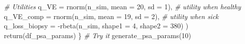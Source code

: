 \documentclass[
]{article}
\newenvironment{Shaded}{\begin{snugshade}}{\end{snugshade}}
\newcommand{\AttributeTok}[1]{\textcolor[rgb]{0.77,0.63,0.00}{#1}}
\newcommand{\CommentTok}[1]{\textcolor[rgb]{0.56,0.35,0.01}{\textit{#1}}}
\newcommand{\DecValTok}[1]{\textcolor[rgb]{0.00,0.00,0.81}{#1}}
\newcommand{\FunctionTok}[1]{\textcolor[rgb]{0.00,0.00,0.00}{#1}}
\newcommand{\NormalTok}[1]{#1}
\newcommand{\SpecialCharTok}[1]{\textcolor[rgb]{0.00,0.00,0.00}{#1}}
\begin{document}
\begin{Shaded}
\begin{Highlighting}[]
    \CommentTok{\# Utilities}
    \AttributeTok{q\_VE          =} \FunctionTok{rnorm}\NormalTok{(n\_sim, }\AttributeTok{mean =} \DecValTok{20}\NormalTok{, }\AttributeTok{sd =} \DecValTok{1}\NormalTok{), }\CommentTok{\# utility when healthy}
    \AttributeTok{q\_VE\_comp     =} \FunctionTok{rnorm}\NormalTok{(n\_sim, }\AttributeTok{mean =} \DecValTok{19}\NormalTok{, }\AttributeTok{sd =} \DecValTok{2}\NormalTok{), }\CommentTok{\# utility when sick}
    \AttributeTok{q\_loss\_biopsy =} \SpecialCharTok{{-}}\FunctionTok{rbeta}\NormalTok{(n\_sim, }\AttributeTok{shape1 =} \DecValTok{4}\NormalTok{, }\AttributeTok{shape2 =} \DecValTok{380}\NormalTok{)}
\NormalTok{  )}
  \FunctionTok{return}\NormalTok{(df\_psa\_params)}
\NormalTok{\}}
\CommentTok{\# Try it}
\FunctionTok{generate\_psa\_params}\NormalTok{(}\DecValTok{10}\NormalTok{) }
\end{Highlighting}
\end{Shaded}
\end{document}
